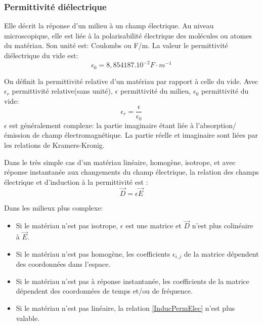 \documentclass[10pt,a4paper]{article}
\begin{document}
\subsubsection{Permittivité diélectrique \cite{permelec}}
Elle décrit la réponse d'un milieu à un champ électrique. Au niveau microscopique, elle est liée à la polarisabilité électrique des molécules ou atomes du matériau. Son unité est: Coulombs ou F/m.
La valeur le permittivité diélectrique du vide est:
\begin{equation}
\epsilon_{0} = 8,854187.10^{-2} F\cdot m^{-1}
\end{equation}

On définit la permittivité relative d'un matériau par rapport à celle du vide. Avec $\epsilon_{r}$ permittivité relative(sans unité), $\epsilon$ permittivité du milieu, $\epsilon_{0}$ permittivité du vide:
\begin{equation}
\epsilon_{r} = \frac{\epsilon}{\epsilon_{0}}
\end{equation}
$\epsilon$ est généralement complexe: la partie imaginaire étant liée à l'absorption/émission de champ électromagnétique. La partie réelle et imaginaire sont liées par les relations de Kramers-Kronig.

Dans le très simple cas d'un matériau linéaire, homogène, isotrope, et avec réponse instantanée aux changements du champ électrique, la relation des champs électrique et d’induction à la permittivité est :
\begin{equation}
\overrightarrow{D} = \epsilon \overrightarrow{E}
\label{InducPermElec}
\end{equation}

Dans les milieux plus complexe:
\begin{itemize}
\item Si le matériau n'est pas isotrope, $\epsilon$ est une matrice et $\overrightarrow{D}$ n'est plus colinéaire à $\overrightarrow{E}$.
\item Si le matériau n'est pas homogène, les coefficients $\epsilon_{i,j}$ de la matrice dépendent des coordonnées dans l'espace.
\item Si le matériau n'est pas à réponse instantanée, les coefficients de la matrice dépendent des coordonnées de temps et/ou de fréquence.
\item Si le matériau n'est pas linéaire, la relation \ref{InducPermElec} n'est plus valable.
\end{itemize}
\end{document}
